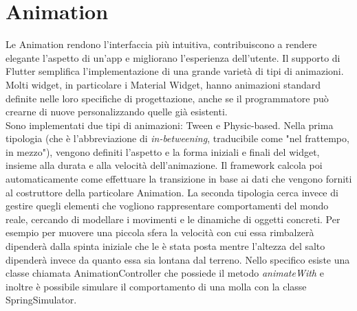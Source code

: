 	\section{Animation}
	Le Animation rendono l'interfaccia più intuitiva, contribuiscono a
	rendere elegante 
	l'aspetto di un'app e migliorano l'esperienza dell'utente. Il
	supporto di Flutter semplifica l'implementazione di una grande varietà di tipi di
	animazioni. Molti widget, in particolare i Material Widget, hanno
	animazioni standard definite nelle loro specifiche di progettazione, 
	anche se il programmatore può crearne di nuove personalizzando quelle già esistenti. \\
	Sono implementati due tipi di animazioni: Tween e Physic-based. Nella prima tipologia
	(che è l'abbreviazione di \textit{in-betweening}, traducibile come "nel frattempo,
	in mezzo"), vengono definiti l'aspetto e la forma iniziali e finali del
	widget, insieme alla durata e alla velocità dell'animazione. Il framework
	calcola poi automaticamente come effettuare la transizione in base ai dati
	che vengono forniti al costruttore della particolare Animation. La seconda
	tipologia cerca invece di gestire quegli elementi che vogliono rappresentare
	comportamenti del mondo reale, cercando di modellare i movimenti e le
	dinamiche di oggetti concreti. Per esempio per muovere una piccola sfera la
	velocità con cui essa rimbalzerà dipenderà dalla spinta iniziale che le è
	stata posta mentre l'altezza del salto dipenderà invece da quanto essa sia lontana dal terreno.
	Nello specifico esiste una classe chiamata AnimationController che possiede
	il metodo \textit{animateWith} e inoltre è possibile simulare il
	comportamento di una molla con la classe SpringSimulator.



	
